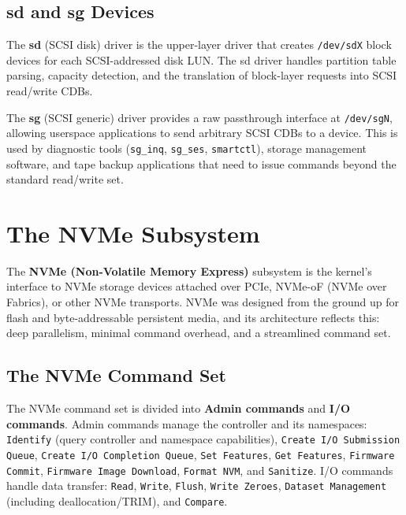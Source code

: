 \subsection{sd and sg Devices}

The \textbf{sd} (SCSI disk) driver is the upper-layer driver that creates \texttt{/dev/sdX} block devices for each SCSI-addressed disk LUN. The sd driver handles partition table parsing, capacity detection, and the translation of block-layer requests into SCSI read/write CDBs.

The \textbf{sg} (SCSI generic) driver provides a raw passthrough interface at \texttt{/dev/sgN}, allowing userspace applications to send arbitrary SCSI CDBs to a device. This is used by diagnostic tools (\texttt{sg\_inq}, \texttt{sg\_ses}, \texttt{smartctl}), storage management software, and tape backup applications that need to issue commands beyond the standard read/write set.

\section{The NVMe Subsystem}
\label{sec:nvme}

The \textbf{NVMe (Non-Volatile Memory Express)} subsystem is the kernel's interface to NVMe storage devices attached over PCIe, NVMe-oF (NVMe over Fabrics), or other NVMe transports. NVMe was designed from the ground up for flash and byte-addressable persistent media, and its architecture reflects this: deep parallelism, minimal command overhead, and a streamlined command set.

\subsection{The NVMe Command Set}

The NVMe command set is divided into \textbf{Admin commands} and \textbf{I/O commands}. Admin commands manage the controller and its namespaces: \texttt{Identify} (query controller and namespace capabilities), \texttt{Create I/O Submission Queue}, \texttt{Create I/O Completion Queue}, \texttt{Set Features}, \texttt{Get Features}, \texttt{Firmware Commit}, \texttt{Firmware Image Download}, \texttt{Format NVM}, and \texttt{Sanitize}. I/O commands handle data transfer: \texttt{Read}, \texttt{Write}, \texttt{Flush}, \texttt{Write Zeroes}, \texttt{Dataset Management} (including deallocation/TRIM), and \texttt{Compare}.

